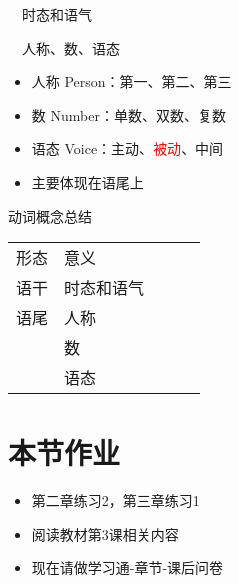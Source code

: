 \documentclass[17pt]{beamer}
\begin{document}
\begin{frame}{\insertsubsection ~~时态和语气}
  \small
  \centering
\end{frame}

\begin{frame}{\insertsubsection ~~人称、数、语态}
  \begin{itemize}
    \item
      人称 Person：第一、第二、第三
    \item
      数 Number：单数、双数、复数
    \item
      语态 Voice：主动、\textcolor{red}{被动}、中间
    \item
      主要体现在语尾上
  \end{itemize}
\end{frame}

\begin{frame}{动词概念总结}
  \centering
  \begin{tabular}{@{}lllll@{}} %
    形态 & 意义 \\
    语干 & 时态和语气  \\
    语尾  & 人称 \\
      & 数 \\
      & 语态 \\
  \end{tabular} 
\end{frame}


\section{本节作业}

\begin{frame}{\insertsection }
  \begin{itemize}
    \item
      第二章练习2，第三章练习1
    \item
      阅读教材第3课相关内容
    \bigskip
    \item
      现在请做学习通\nobreakdash-章节\nobreakdash-课后问卷
  \end{itemize}
\end{frame}  
\end{document}
